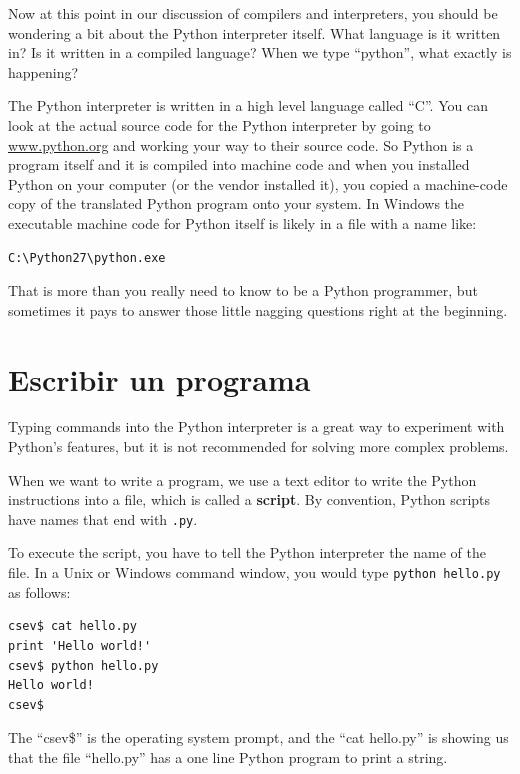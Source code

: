 Now at this point in our discussion of compilers and interpreters, you should 
be wondering a bit about the Python interpreter itself.  What language is 
it written in?  Is it written in a compiled language?  When we type
``python'', what exactly is happening?

The Python interpreter is written in a high level language called ``C''.  
You can look at the actual source code for the Python interpreter by
going to \url{www.python.org} and working your way to their source code.
So Python is a program itself and it is compiled into machine code and
when you installed Python on your computer (or the vendor installed it),
you copied a machine-code copy of the translated Python program onto your
system.   In Windows the executable machine code for Python itself is likely
in a file with a name like:

\beforeverb
\begin{verbatim}
C:\Python27\python.exe
\end{verbatim}
\afterverb
%
That is more than you really need to know to be a Python programmer, but
sometimes it pays to answer those little nagging questions right at 
the beginning.

\section{Escribir un programa}

Typing commands into the Python interpreter is a great way to experiment 
with Python's features, but it is not recommended for solving more complex problems.

When we want to write a program, 
we use a text editor to write the Python instructions into a file,
which is called a {\bf script}.  By
convention, Python scripts have names that end with {\tt .py}.


To execute the script, you have to tell the Python interpreter 
the name of the file.  In a Unix or Windows command window, 
you would type {\tt python hello.py} as follows:

\beforeverb
\begin{verbatim}
csev$ cat hello.py
print 'Hello world!'
csev$ python hello.py
Hello world!
csev$
\end{verbatim}
\afterverb
%
The ``csev\$'' is the operating system prompt, and the ``cat hello.py'' is 
showing us that the file ``hello.py'' has a one line Python program to print
a string.

